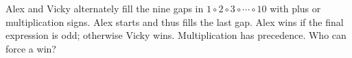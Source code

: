 Alex and Vicky alternately fill the nine gaps in $1\circ2\circ3\circ\cdots\circ10$ with plus or multiplication signs. Alex starts and thus fills the last gap. Alex wins if the final expression is odd; otherwise Vicky wins. Multiplication has precedence. Who can force a win?
